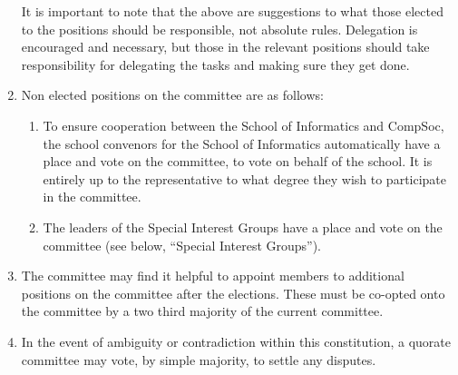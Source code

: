 \begin{enumerate}
  It is important to note that the above are suggestions to what those elected to the positions should be responsible, not absolute rules. Delegation is encouraged and necessary, but those in the relevant positions should take responsibility for delegating the tasks and making sure they get done.

\item Non elected positions on the committee are as follows:
  \begin{enumerate}
  \item To ensure cooperation between the School of Informatics and CompSoc, the school convenors for the School of Informatics automatically have a place and vote on the committee, to vote on behalf of the school. It is entirely up to the representative to what degree they wish to participate in the committee.
  \item The leaders of the Special Interest Groups have a place and vote on the committee (see below, \enquote{Special Interest Groups}).
  \end{enumerate}

\item The committee may find it helpful to appoint members to additional positions on the committee after the elections. These must be co-opted onto the committee by a two third majority of the current committee.

\item In the event of ambiguity or contradiction within this constitution, a quorate committee may vote, by simple majority, to settle any disputes.

\end{enumerate}

